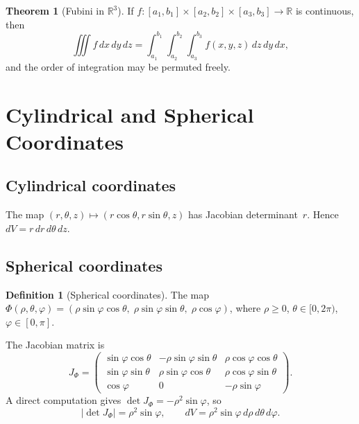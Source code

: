 \documentclass[12pt,a4paper]{book}
\theoremstyle{definition}
\newtheorem{definition}{Definition}[chapter]
\newtheorem{theorem}{Theorem}[chapter]
\begin{document}
\begin{theorem}[Fubini in $\mathbb{R}^3$]
\label{thm:fubini-3d}
If $f\colon[a_1,b_1]\times[a_2,b_2]\times[a_3,b_3]\to\mathbb{R}$ is
continuous, then
\[
  \iiint f\,dx\,dy\,dz
  = \int_{a_1}^{b_1}\int_{a_2}^{b_2}\int_{a_3}^{b_3}
    f(x,y,z)\,dz\,dy\,dx,
\]
and the order of integration may be permuted freely.
\end{theorem}

\section{Cylindrical and Spherical Coordinates}
\label{sec:cyl-sph}

\subsection{Cylindrical coordinates}

The map $(r,\theta,z)\mapsto(r\cos\theta,r\sin\theta,z)$ has Jacobian
determinant~$r$.  Hence $dV=r\,dr\,d\theta\,dz$.

\subsection{Spherical coordinates}

\begin{definition}[Spherical coordinates]\label{def:spherical-coords}
The map $\Phi(\rho,\theta,\varphi)
=(\rho\sin\varphi\cos\theta,\;\rho\sin\varphi\sin\theta,\;\rho\cos\varphi)$,
where $\rho\ge 0$, $\theta\in[0,2\pi)$, $\varphi\in[0,\pi]$.
\end{definition}

The Jacobian matrix is
\[
  J_\Phi = \begin{pmatrix}
    \sin\varphi\cos\theta & -\rho\sin\varphi\sin\theta
      & \rho\cos\varphi\cos\theta \\
    \sin\varphi\sin\theta & \rho\sin\varphi\cos\theta
      & \rho\cos\varphi\sin\theta \\
    \cos\varphi & 0 & -\rho\sin\varphi
  \end{pmatrix}.
\]
A direct computation gives $\det J_\Phi = -\rho^2\sin\varphi$, so
\[
  |\det J_\Phi| = \rho^2\sin\varphi,
  \qquad dV = \rho^2\sin\varphi\,d\rho\,d\theta\,d\varphi.
\]
\end{document}
